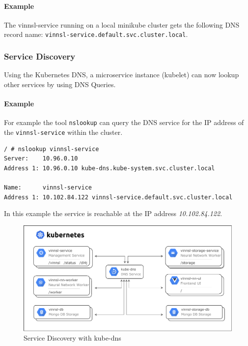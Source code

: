 \paragraph{Example}\label{example}

The vinnsl-service running on a local minikube cluster gets the
following DNS record name:
\texttt{vinnsl-service.default.svc.cluster.local}.

\subsubsection{Service Discovery}\label{service-discovery}

Using the Kubernetes DNS, a microservice instance (kubelet) can now
lookup other services by using DNS Queries.

\paragraph{Example}\label{example-1}

For example the tool \texttt{nslookup} can query the DNS service for the
IP address of the \texttt{vinnsl-service} within the cluster.

\begin{verbatim}
/ # nslookup vinnsl-service
Server:    10.96.0.10
Address 1: 10.96.0.10 kube-dns.kube-system.svc.cluster.local

Name:      vinnsl-service
Address 1: 10.102.84.122 vinnsl-service.default.svc.cluster.local
\end{verbatim}

In this example the service is reachable at the IP address
\emph{10.102.84.122}.

\begin{figure}
\centering
\includegraphics[width=15.00000cm]{images/overview_main_services}
\caption{Service Discovery with kube-dns \label{img.service-discovery}}
\end{figure}

